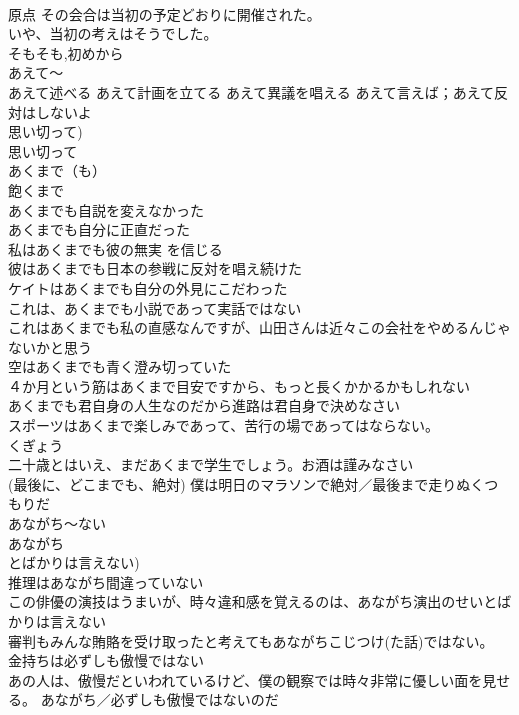 \documentclass[8pt]{extreport}
\begin{document}
\begin{CJK}{UTF8}{min}
\\	原点 その会合は当初の予定どおりに開催された。　
\\	いや、当初の考えはそうでした。　
\\	そもそも,初めから
\\	あえて～	
\\	あえて述べる あえて計画を立てる あえて異議を唱える あえて言えば；あえて反対はしないよ	
\\	思い切って) 
\\	思い切って
\\	あくまで（も）　 
\\	{飽くまで}	
\\	あくまでも自説を変えなかった 
\\	あくまでも自分に正直だった 
\\	私はあくまでも彼の無実 を信じる 
\\	彼はあくまでも日本の参戦に反対を唱え続けた 
\\	ケイトはあくまでも自分の外見にこだわった　
\\	これは、あくまでも小説であって実話ではない 
\\	これはあくまでも私の直感なんですが、山田さんは近々この会社をやめるんじゃないかと思う 
\\	空はあくまでも青く澄み切っていた 
\\	４か月という筋はあくまで目安ですから、もっと長くかかるかもしれない 
\\	あくまでも君自身の人生なのだから進路は君自身で決めなさい 
\\	スポーツはあくまで楽しみであって、苦行の場であってはならない。
\\	くぎょう 
\\	二十歳とはいえ、まだあくまで学生でしょう。お酒は謹みなさい 
\\	(最後に、どこまでも、絶対) 僕は明日のマラソンで絶対／最後まで走りぬくつもりだ
\\	あながち～ない 
\\	あながち
\\	とばかりは言えない)	
\\	推理はあながち間違っていない 
\\	この俳優の演技はうまいが、時々違和感を覚えるのは、あながち演出のせいとばかりは言えない 
\\	審判もみんな賄賂を受け取ったと考えてもあながちこじつけ(た話)ではない。 
\\	金持ちは必ずしも傲慢ではない 
\\	あの人は、傲慢だといわれているけど、僕の観察では時々非常に優しい面を見せる。 あながち／必ずしも傲慢ではないのだ 

\end{CJK}
\end{document}
